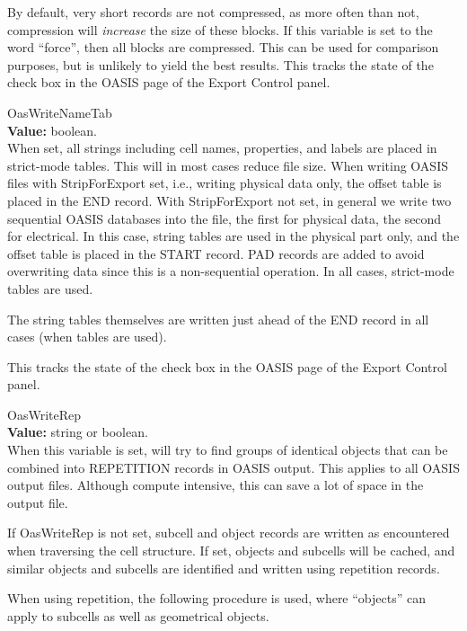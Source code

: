 \begin{description}
By default, very short records are not compressed, as more often than
not, compression will {\it increase} the size of these blocks.  If
this variable is set to the word ``{\vt force}'', then all blocks are
compressed.  This can be used for comparison purposes, but is unlikely
to yield the best results.  This tracks the state of the check box in
the {\cb OASIS} page of the {\cb Export Control} panel.

\item{\et OasWriteNameTab}\\
{\bf Value:} boolean.\\
When set, all strings including cell names, properties, and labels are
placed in strict-mode tables.  This will in most cases reduce file
size.  When writing OASIS files with {\et StripForExport} set, i.e.,
writing physical data only, the offset table is placed in the END
record.  With {\et StripForExport} not set, in general we write two
sequential OASIS databases into the file, the first for physical data,
the second for electrical.  In this case, string tables are used in
the physical part only, and the offset table is placed in the START
record.  PAD records are added to avoid overwriting data since this is
a non-sequential operation.  In all cases, strict-mode tables are
used.

The string tables themselves are written just ahead of the END
record in all cases (when tables are used).

This tracks the state of the check box in the {\cb OASIS} page of the
{\cb Export Control} panel.

\label{OasWriteRep}
\item{\et OasWriteRep}\\
{\bf Value:} string or boolean.\\
When this variable is set, {\Xic} will try to find groups of identical
objects that can be combined into REPETITION records in OASIS output. 
This applies to all OASIS output files.  Although compute intensive,
this can save a lot of space in the output file.

If {\et OasWriteRep} is not set, subcell and object records are
written as encountered when traversing the cell structure.  If set,
objects and subcells will be cached, and similar objects and subcells
are identified and written using repetition records.

When using repetition, the following procedure is used, where
``objects'' can apply to subcells as well as geometrical objects.


\end{description}

